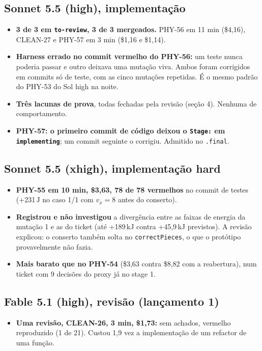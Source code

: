 \documentclass[11pt,a4paper]{article}
\begin{document}
\subsection*{Sonnet 5.5 (high), implementação}
\begin{itemize}
  \item \textbf{3 de 3 em \texttt{to-review}, 3 de 3 mergeados.} PHY-56 em
        11 min (\$4,16), CLEAN-27 e PHY-57 em 3 min (\$1,16 e \$1,14).
  \item \textbf{Harness errado no commit vermelho do PHY-56:} um teste nunca
        poderia passar e outro deixava uma mutação viva. Ambos foram corrigidos
        em commits só de teste, com as cinco mutações repetidas. É o mesmo
        padrão do PHY-53 do Sol high na noite.
  \item \textbf{Três lacunas de prova}, todas fechadas pela revisão (seção 4).
        Nenhuma de comportamento.
  \item \textbf{PHY-57: o primeiro commit de código deixou o
        \texttt{Stage:} em \texttt{implementing}}; um commit seguinte o
        corrigiu. Admitido no \texttt{.final}.
\end{itemize}

\subsection*{Sonnet 5.5 (xhigh), implementação hard}
\begin{itemize}
  \item \textbf{PHY-55 em 10 min, \$3,63, 78 de 78 vermelhos} no commit de
        testes (+231\,J no caso 1/1 com $v_x = 8$ antes do conserto).
  \item \textbf{Registrou e não investigou} a divergência entre as faixas de
        energia da mutação 1 e as do ticket (até +189\,kJ contra +45,9\,kJ
        previstos). A revisão explicou: o conserto também solta no
        \texttt{correctPieces}, o que o protótipo provavelmente não fazia.
  \item \textbf{Mais barato que no PHY-54} (\$3,63 contra \$8,82 com a
        reabertura), num ticket com 9 decisões do proxy já no stage 1.
\end{itemize}

\subsection*{Fable 5.1 (high), revisão (lançamento 1)}
\begin{itemize}
  \item \textbf{Uma revisão, CLEAN-26, 3 min, \$1,73:} sem achados, vermelho
        reproduzido (1 de 21). Custou 1,9 vez a implementação de um refactor de
        uma função.
\end{itemize}
\end{document}
